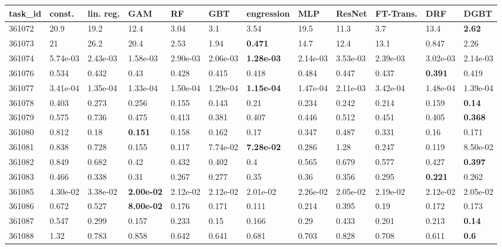 \begin{table}[ht!]
\centering
\begingroup\footnotesize
\begin{tabular}{llllllllllll}
  \hline
\hline
task\_id & const. & lin. reg. & GAM & RF & GBT & engression & MLP & ResNet & FT-Trans. & DRF & DGBT \\ 
  \hline
361072 & 20.9 & 19.2 & 12.4 & 3.04 & 3.1 & 3.54 & 19.5 & 11.3 & 3.7 & 13.4 & \textbf{2.62} \\ 
  361073 & 21 & 26.2 & 20.4 & 2.53 & 1.94 & \textbf{0.471} & 14.7 & 12.4 & 13.1 & 0.847 & 2.26 \\ 
  361074 & 5.74e-03 & 2.43e-03 & 1.58e-03 & 2.90e-03 & 2.06e-03 & \textbf{1.28e-03} & 2.14e-03 & 3.53e-03 & 2.39e-03 & 3.02e-03 & 2.14e-03 \\ 
  361076 & 0.534 & 0.432 & 0.43 & 0.428 & 0.415 & 0.418 & 0.484 & 0.447 & 0.437 & \textbf{0.391} & 0.419 \\ 
  361077 & 3.41e-04 & 1.35e-04 & 1.33e-04 & 1.50e-04 & 1.29e-04 & \textbf{1.15e-04} & 1.47e-04 & 2.11e-03 & 3.42e-04 & 1.48e-04 & 1.39e-04 \\ 
  361078 & 0.403 & 0.273 & 0.256 & 0.155 & 0.143 & 0.21 & 0.234 & 0.242 & 0.214 & 0.159 & \textbf{0.14} \\ 
  361079 & 0.575 & 0.736 & 0.475 & 0.413 & 0.381 & 0.407 & 0.446 & 0.512 & 0.451 & 0.405 & \textbf{0.368} \\ 
  361080 & 0.812 & 0.18 & \textbf{0.151} & 0.158 & 0.162 & 0.17 & 0.347 & 0.487 & 0.331 & 0.16 & 0.171 \\ 
  361081 & 0.838 & 0.728 & 0.155 & 0.117 & 7.74e-02 & \textbf{7.28e-02} & 0.286 & 1.28 & 0.247 & 0.119 & 8.50e-02 \\ 
  361082 & 0.849 & 0.682 & 0.42 & 0.432 & 0.402 & 0.4 & 0.565 & 0.679 & 0.577 & 0.427 & \textbf{0.397} \\ 
  361083 & 0.466 & 0.338 & 0.31 & 0.267 & 0.277 & 0.35 & 0.36 & 0.356 & 0.295 & \textbf{0.221} & 0.262 \\ 
  361085 & 4.30e-02 & 3.38e-02 & \textbf{2.00e-02} & 2.12e-02 & 2.12e-02 & 2.01e-02 & 2.26e-02 & 2.05e-02 & 2.19e-02 & 2.12e-02 & 2.05e-02 \\ 
  361086 & 0.672 & 0.527 & \textbf{8.00e-02} & 0.176 & 0.171 & 0.111 & 0.214 & 0.395 & 0.19 & 0.172 & 0.173 \\ 
  361087 & 0.547 & 0.299 & 0.157 & 0.233 & 0.15 & 0.166 & 0.29 & 0.433 & 0.201 & 0.213 & \textbf{0.14} \\ 
  361088 & 1.32 & 0.783 & 0.858 & 0.642 & 0.641 & 0.681 & 0.703 & 0.828 & 0.708 & 0.611 & \textbf{0.6} \\ 

\end{tabular}
\end{table}
